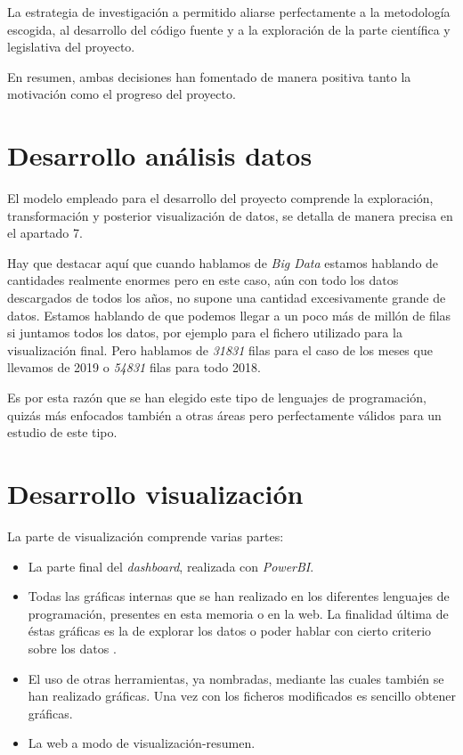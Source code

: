 La estrategia de investigación a permitido aliarse perfectamente a la metodología escogida, al desarrollo del código fuente y a la exploración de la parte científica y legislativa del proyecto.

En resumen, ambas decisiones han fomentado de manera positiva tanto la motivación como el progreso del proyecto.


\section{Desarrollo análisis datos}
El modelo empleado para el desarrollo del proyecto comprende la exploración, transformación y posterior visualización de datos, se detalla de manera precisa en el apartado 7. 

Hay que destacar aquí que cuando hablamos de \textit{Big Data} estamos hablando de cantidades realmente enormes pero en este caso, aún con todo los datos descargados de todos los años, no supone una cantidad excesivamente grande de datos. Estamos hablando de que podemos llegar a un poco más de millón de filas si juntamos todos los datos, por ejemplo para el fichero utilizado para la visualización final. Pero hablamos de \textit{31831} filas para el caso de los meses que llevamos de 2019 o \textit{54831} filas para todo 2018. 

Es por esta razón que se han elegido este tipo de lenguajes de programación, quizás más enfocados también a otras áreas pero perfectamente válidos para un estudio de este tipo.

 
\section{Desarrollo visualización}\label{grafico}
La parte de visualización comprende varias partes:

\begin{itemize}
	\item La parte final del \textit{dashboard}, realizada con \textit{PowerBI}.
	\item Todas las gráficas internas que se han realizado en los diferentes lenguajes de programación, presentes en esta memoria o en la web. La finalidad última de éstas gráficas es la de explorar los datos o poder hablar con cierto criterio sobre los datos .
	\item El uso de otras herramientas, ya nombradas, mediante las cuales también se han realizado gráficas. Una vez con los ficheros modificados es sencillo obtener gráficas.
	\item La  web a modo de visualización-resumen.
\end{itemize}

